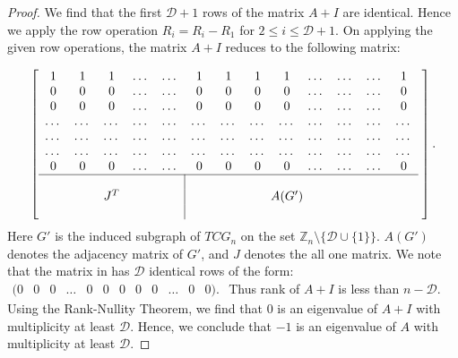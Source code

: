 \documentclass[10pt,a4paper]{amsart}
\begin{document}
\begin{proof}
		We find that the first $\mathcal{D}+1$ rows of the matrix $A+I$ are identical.
		Hence we apply the row operation $R_i=R_i-R_1$ for $2\le i\le \mathcal{D}+1$.
		On applying the given row operations, the matrix $A+I$ reduces to the following matrix:
		
		\begin{equation}
			\label{Eq2}
			\left[
			\begin{array}{cccccccccccccccccccccccccccccccccccccccccccccc}
				1 & 1 & 1& \ldots &\dots & \textbf{1}&1 & 1 & 1& \ldots&\ldots &\ldots& 1\\
				0 & 0 & 0& \ldots &\dots &\textbf{0}&0 & 0 & 0& \ldots &\ldots&\ldots& 0\\
				0& 0 & 0 &\ldots&\dots& \textbf{0}&0 & 0 & 0& \ldots &\ldots&\ldots& 0\\
				\ldots& \ldots &\ldots &\ldots&\ldots& \ldots &\ldots &\ldots&\ldots&\ldots&\ldots&\ldots&\ldots\\
				\ldots& \ldots &\ldots &\ldots&\ldots& \ldots &\ldots &\ldots&\ldots&\ldots&\ldots&\ldots&\ldots\\
				\ldots& \ldots &\ldots &\ldots&\ldots& \ldots &\ldots &\ldots&\ldots&\ldots&\ldots&\ldots&\ldots\\
				\textbf{0}& \textbf{0} &\textbf{0}&\ldots &\ldots& \textbf{0} &\textbf{0} & \textbf{0} & \textbf{0}& \ldots &\ldots&\ldots& \textbf{0}\\
				\cline{1-13}
				&   &                      &   & \multicolumn{1}{c|}{}  &   &                        \\
				&   & \makebox[0pt]{\huge{$J^T$}}    &   & \multicolumn{1}{c|}{}  &&   &&\makebox[0pt]{\huge{$A(G')$}}    \\
				&   &                      &   & \multicolumn{1}{c|}{}  &   &
			\end{array} \;
			\right].
		\end{equation}
		Here $G'$ is the induced subgraph of $TCG_n$ on the set $\mathbb Z_n\setminus \{\mathcal{D}\cup \{1\}\}.$ 
		$A(G')$ denotes the adjacency matrix of $G'$, and $J$ denotes the all one matrix.
		We note that the matrix in   has $\mathcal{D}$ identical rows of the form: 
		$\begin{array}{ccccccccccccccccc}
			(0 & 0 & 0 &\dots & 0 &0 &0&0&0&\dots&0 &0 ).
		\end{array}$
		Thus rank of $A+I$ is less than $n-\mathcal{D}$. Using the Rank-Nullity Theorem, we find that  $0$ is an eigenvalue of $A+I$ with multiplicity at least $\mathcal{D}$. Hence, we conclude that $-1$ is an eigenvalue of $A$ with multiplicity at least $\mathcal{D}$.
		
		
	\end{proof}
\end{document}
